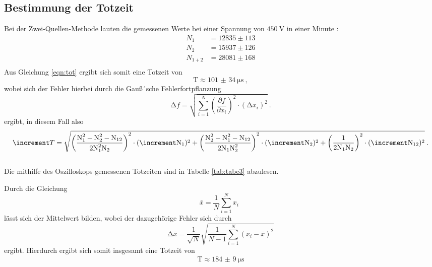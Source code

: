 \subsection{Bestimmung der Totzeit}

Bei der Zwei-Quellen-Methode lauten die gemessenen Werte bei einer Spannung von
$\SI{450}{\volt}$ in einer Minute :
\begin{align*}
  N_1 &= 12835 \pm 113 \\
  N_2 &= 15937 \pm 126 \\
  N_{1+2} &= 28081 \pm 168 \\
\end{align*}
Aus Gleichung \ref{eqn:tot} ergibt sich somit eine Totzeit von
\begin{equation*}
  \text{T} \approx \SI{101(34)}{\micro\second} \: ,
\end{equation*}
wobei sich der Fehler hierbei durch die Gauß´sche Fehlerfortpflanzung
\begin{equation}
  \increment f = \sqrt{ \sum_{i=1}^N \left( \frac{\partial f}{\partial x_i}\right)^2
  \cdot (\increment x_i)^2  } \: .
  \label{eqn:gaus}
\end{equation}
ergibt, in diesem Fall also
\begin{equation}
  \increment T = \sqrt{\left( \frac{\text{N}_{1}^2-\text{N}_{2}^2-\text{N}_{12}}{2\text{N}_{1}^2\text{N}_{2}} \right)^2 \cdot (\increment \text{N}_{1})^2 \\
   + \left( \frac{\text{N}_{2}^2-\text{N}_{1}^2-\text{N}_{12}}{2\text{N}_{1}\text{N}_{2}^2} \right)^2 \cdot (\increment \text{N}_{2})^2
  +\left( \frac{1}{2\text{N}_{1}\text{N}_{2}} \right)^2 \cdot (\increment \text{N}_{12})^2 } \: .
\end{equation}
 \\
Die mithilfe des Oszilloskops gemessenen Totzeiten sind in Tabelle \ref{tab:tabe3}
abzulesen.

Durch die Gleichung
\begin{equation}
  \bar{x} = \frac{1}{N} \sum_{i=1}^{N} x_i \: \:
  \label{eqn:mit}
\end{equation}
\noindent lässt sich der Mittelwert bilden, wobei der dazugehörige Fehler sich durch
\begin{equation}
  \increment \bar{x} = \frac{1}{\sqrt{N}} \sqrt{ \frac{1}{N-1} \sum_{i=1}^N
  (x_i - \bar{x})^2}
  \label{eqn:mitf}
\end{equation}
ergibt. Hierdurch ergibt sich somit insgesamt eine Totzeit von
\begin{align*}
  \text{T} \approx \SI{184(9)}{\micro\second}
\end{align*}

